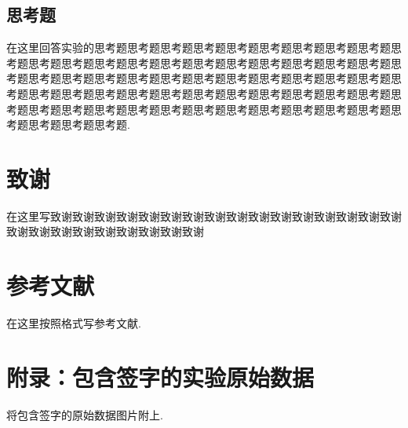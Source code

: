 \documentclass[9pt,a4paper,twoside]{../rho-class/rho}
\begin{document}
\subsection{思考题}
在这里回答实验的思考题思考题思考题思考题思考题思考题思考题思考题思考题思考题思考题思考题思考题思考题思考题思考题思考题思考题思考题思考题思考题思考题思考题思考题思考题思考题思考题思考题思考题思考题思考题思考题思考题思考题思考题思考题思考题思考题思考题思考题思考题思考题思考题思考题思考题思考题思考题思考题思考题思考题思考题思考题思考题思考题思考题思考题思考题思考题思考题思考题思考题.
\section{致谢}
在这里写致谢致谢致谢致谢致谢致谢致谢致谢致谢致谢致谢致谢致谢致谢致谢致谢致谢致谢致谢致谢致谢致谢致谢致谢致谢
\section*{参考文献}
在这里按照格式写参考文献.
\section*{附录：包含签字的实验原始数据}
将包含签字的原始数据图片附上.
\end{document}
